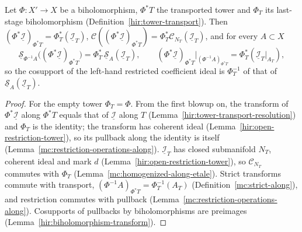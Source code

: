 \begin{lemma}
\label{mc:coefficient-transported-tower}
\leanok
Let \(\Phi\colon X'\to X\) be a biholomorphism, \(\Phi^*T\) the transported tower and \(\Phi_T\) its last-stage biholomorphism (Definition~\ref{hir:tower-transport}). Then
\((\Phi^*\underline{\mathcal I})_{\Phi^*T}=\Phi_T^*(\underline{\mathcal I}_T)\), \(\mathcal C((\Phi^*\underline{\mathcal I})_{\Phi^*T})=\Phi_T^*\mathcal C_{N_T}(\underline{\mathcal I}_T)\), and for every
\(A\subset X\)
\[\underline{\mathcal S}_{\Phi^{-1}A}\bigl((\Phi^*\underline{\mathcal I})_{\Phi^*T}\bigr)=\Phi_T^*\,\underline{\mathcal S}_A(\underline{\mathcal I}_T),\qquad
(\Phi^*\underline{\mathcal I})_{\Phi^*T}|_{(\Phi^{-1}A)_{\Phi^*T}}=\Phi_T^*(\underline{\mathcal I}_T|_{A_T}),\]
so the cosupport of the left-hand restricted coefficient ideal is \(\Phi_T^{-1}\) of that of \(\underline{\mathcal S}_A(\underline{\mathcal I}_T)\).
\end{lemma}
\begin{proof}
\leanok
For the empty tower \(\Phi_T=\Phi\). From the first blowup on, the transform of \(\Phi^*\underline{\mathcal I}\) along \(\Phi^*T\) equals that of \(\underline{\mathcal I}\) along \(T\)
(Lemma~\ref{hir:tower-transport-resolution}) and \(\Phi_T\) is the identity; the transform has coherent ideal (Lemma~\ref{hir:open-restriction-tower}), so its pullback along
the identity is itself (Lemma~\ref{mc:restriction-operations-along}). \(\underline{\mathcal I}_T\) has closed submanifold \(N_T\), coherent ideal and mark \(d\)
(Lemma~\ref{hir:open-restriction-tower}), so \(\mathcal C_{N_T}\) commutes with \(\Phi_T\) (Lemma~\ref{mc:homogenized-along-etale}). Strict transforms commute with
transport, \((\Phi^{-1}A)_{\Phi^*T}=\Phi_T^{-1}(A_T)\) (Definition~\ref{mc:strict-along}), and restriction commutes with pullback
(Lemma~\ref{mc:restriction-operations-along}). Cosupports of pullbacks by biholomorphisms are preimages (Lemma~\ref{hir:biholomorphism-transform}).
\end{proof}

